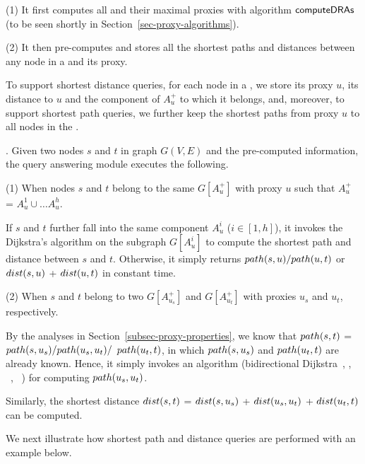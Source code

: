 \sstab (1) It first computes all \dras and their maximal proxies with algorithm ${\mathsf{computeDRAs}}$ (to be seen shortly in Section~\ref{sec-proxy-algorithms}).

\sstab (2) It then pre-computes and stores all the shortest paths and distances between any node in a \dra and its proxy.

To support shortest distance queries, for each node in a \dra, we store its proxy $u$, its distance to $u$ and the component of $A^{+}_u$ to which it belongs,
and, moreover, to support shortest path queries, we further keep the shortest paths from proxy $u$ to all nodes in the \dra.


. Given two nodes $s$ and $t$ in graph $G(V, E)$  and the pre-computed information, the query answering module executes the following.


\sstab (1) When nodes $s$ and $t$ belong to the same \dra $G[A^+_u]$ with proxy $u$ such that $A^+_u$ = $A^1_u\cup\ldots A^h_u$.

If $s$ and $t$ further fall into the same component $A^i_u$ ($i\in[1,h]$), it invokes the Dijkstra's algorithm on the subgraph $G[A^i_u]$ to compute the shortest path and distance between $s$ and $t$. Otherwise, it simply returns $\path(s, u)/\path(u, t)$ or $\dist(s, u)$ + $\dist(u, t)$ in constant time.

\sstab (2)  When $s$ and $t$ belong to two \dras $G[A^+_{u_s}]$ and $G[A^+_{u_t}]$ with proxies $u_s$ and $u_t$, respectively.

By the analyses in Section~\ref{subsec-proxy-properties}, we know that $\path(s, t)$ = $\path(s, u_s)/\path(u_s, u_t)/$ $\path(u_t, t)$, in which $\path(s, u_s)$ and $\path(u_t, t)$ are already known. Hence, it simply invokes an algorithm (\eg bidirectional Dijkstra~\cite{LubyR89}, \arcflag \cite{MohringSSWW05}, \ch~\cite{GeisbergerSSD08}, \tnr~\cite{bast2014route}) for computing $\path(u_s, u_t)$.

Similarly, the shortest distance $\dist(s, t)$ = $\dist(s, u_s)$ + $\dist(u_s, u_t)$ + $\dist(u_t, t)$ can be computed.

We next illustrate how shortest path and distance queries are performed  with an example below.

